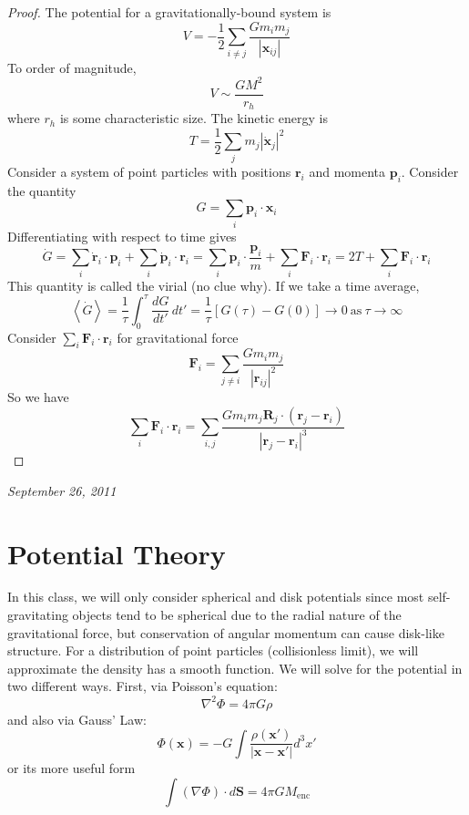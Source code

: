 \documentclass[10pt]{article}
\newcommand{\n}{\noindent}
\newcommand{\norm}[1]{\left|#1\right|}
\newcommand{\avg}[1]{\left<#1\right>}
\begin{document}
	\n\begin{proof}
		The potential for a gravitationally-bound system is
		$$V=-\frac{1}{2}\sum_{i\neq j}\frac{Gm_im_j}{\norm{\mathbf{x}_{ij}}}$$
		To order of magnitude, 
		$$V \sim \frac{GM^2}{r_h}$$
		where $r_h$ is some characteristic size. The kinetic energy is
		$$T = \frac{1}{2}\sum_j m_j\norm{\dot{\mathbf{x}}_j}^2$$
		Consider a system of point particles with positions $\mathbf{r}_i$ and momenta $\mathbf{p}_i$. Consider the quantity
		$$G=\sum_{i}\mathbf{p}_i\cdot\mathbf{x}_i$$
		Differentiating with respect to time gives
		$$\dot{G} = \sum_i \dot{\mathbf{r}}_i\cdot \mathbf{p}_i+\sum_i\dot{\mathbf{p}}_i\cdot\mathbf{r}_i=\sum_i\mathbf{p}_i\cdot\frac{\mathbf{p}_i}{m}+\sum_i\mathbf{F}_i\cdot\mathbf{r}_i = 2T+\sum_i\mathbf{F}_i\cdot\mathbf{r}_i$$
		This quantity is called the virial (no clue why). If we take a time average,
		$$\avg{\dot{G}} = \frac{1}{\tau}\int_0^\tau\frac{dG}{dt'}\,dt' = \frac{1}{\tau}\left[G(\tau)-G(0)\right]\to 0\ \textrm{as}\ \tau\to \infty$$
		Consider $\sum_i\mathbf{F}_i\cdot\mathbf{r}_i$ for gravitational force
		$$\mathbf{F}_i = \sum_{j\neq i}\frac{Gm_im_j}{\norm{\mathbf{r}_{ij}}^2}$$
		So we have
		$$\sum_i \mathbf{F}_i\cdot\mathbf{r}_i=\sum_{i,j}\frac{Gm_im_j\mathbf{R}_j\cdot(\mathbf{r}_j-\mathbf{r}_i)}{\norm{\mathbf{r}_j-\mathbf{r}_i}^3}$$		
	\end{proof}
	
	\n\emph{September 26, 2011}
	\section{Potential Theory}
	In this class, we will only consider spherical and disk potentials since most self-gravitating objects tend to be spherical due to the radial nature of the gravitational force, but conservation of angular momentum can cause disk-like structure.
	For a distribution of point particles (collisionless limit), we will approximate the density has a smooth function. We will solve for the potential in two different ways. First, via Poisson's equation:
	\begin{equation}\label{poisson} \nabla^2\Phi = 4\pi G\rho\end{equation}
	and also via Gauss' Law:
	\begin{equation}\label{gauss1} \Phi(\mathbf{x})=-G\int\frac{\rho(\mathbf{x}')}{\norm{\mathbf{x}-\mathbf{x}'}}d^3x'\end{equation}
	or its more useful form
	\begin{equation} \label{gauss2} \int (\nabla\Phi)\cdot d\mathbf{S}=4\pi G M_{\mathrm{enc}}\end{equation}
\end{document}
